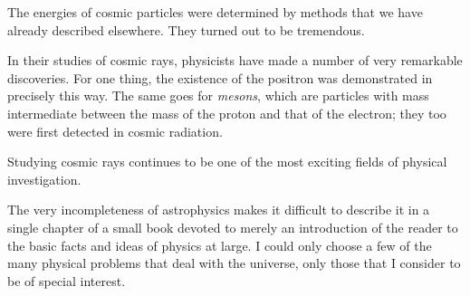 The energies of cosmic particles were determined by methods that we have already described elsewhere. They turned out to be tremendous.

In their studies of cosmic rays, physicists have made a number of very remarkable discoveries. For one thing, the existence of the positron was demonstrated in precisely this way. The same goes for \emph{mesons}, which are parti­cles with mass intermediate between the mass of the proton and that of the electron; they too were first detected in cosmic radiation.

Studying cosmic rays continues to be one of the most exciting fields of physical investigation.

\begin{center}
\end{center}


The very incompleteness of astrophysics makes it dif­ficult to describe it in a single chapter of a small book devoted to merely an introduction of the reader to the basic facts and ideas of physics at large. I could only choose a few of the many physical problems that deal with the universe, only those that I consider to be of special interest.